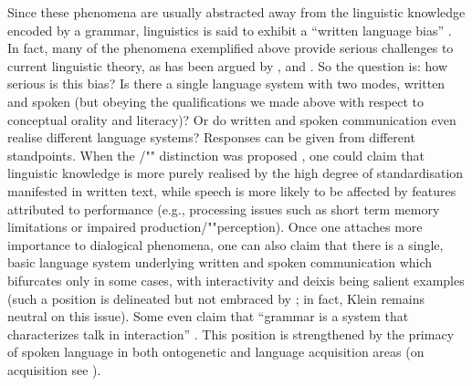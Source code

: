 \documentclass[output=paper]{langsci/langscibook}
\begin{document}
{
Since these phenomena are usually abstracted away from the linguistic knowledge encoded by a grammar, linguistics is said to exhibit a \enquote{written language bias}  \citep{Linell:1982}.
%
In fact, many of the phenomena exemplified above provide serious challenges  to current  linguistic theory, as has been argued by \citet{Ginzburg:2012}, \citet{Ginzburg:Poesio:2016} and \citet{Kempson:Cann:Gregoromichelaki:Chatzikyriakidis:2016}.
%
So the question is: how serious is this bias? 
%
Is there a single language system with two modes, written and spoken (but obeying the qualifications we made above with respect to conceptual orality and literacy)?
%
Or do written and spoken communication even realise different language systems?
%
Responses can be given from different standpoints. 
%
When the /""  distinction was proposed \citep{Chomsky:1969}, one could claim that linguistic knowledge is more purely realised by the high degree of standardisation manifested in written text, while speech is more likely to be affected by features attributed to performance (e.g.,  processing issues such as short term memory limitations or impaired production/""perception).
%
Once one attaches more importance to dialogical phenomena, one can also claim that there is a single, basic language system underlying written and spoken communication which bifurcates only in some cases, with interactivity and deixis being salient examples (such a position is delineated but not embraced by \citet{Klein:1985}; in fact, Klein remains neutral on this issue). 
%
Some even claim that \enquote{grammar is a system that characterizes talk in interaction} \citep[]{Ginzburg:Poesio:2016}. 
%
This position is strengthened by the primacy of spoken language in both ontogenetic and language acquisition areas (on acquisition see ).

}
\end{document}
